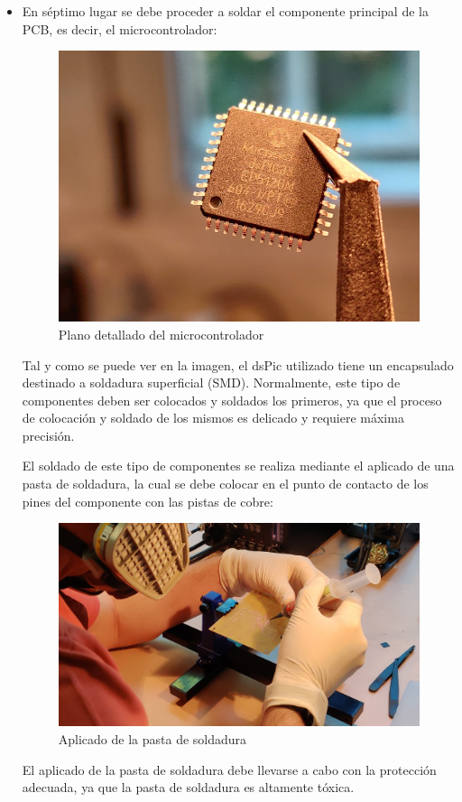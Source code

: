 \begin{itemize}
    \item En séptimo lugar se debe proceder a soldar el componente principal de la \ac{PCB}, es decir, el microcontrolador:
    
    \begin{figure}[H]
    \centering 
    \includegraphics[width=0.5\linewidth]{pictures/DSPIC.jpg}
    \caption{Plano detallado del microcontrolador}
    \label{fig:kdiagram}
    \end{figure}
    
    Tal y como se puede ver en la imagen, el dsPic utilizado tiene un encapsulado destinado a soldadura superficial (\ac{SMD}). Normalmente, este tipo de componentes deben ser colocados y soldados los primeros, ya que el proceso de colocación y soldado de los mismos es delicado y requiere máxima precisión.
    
    El soldado de este tipo de componentes se realiza mediante el aplicado de una pasta de soldadura, la cual se debe colocar en el punto de contacto de los pines del componente con las pistas de cobre:
    
    \begin{figure}[H]
    \centering 
    \includegraphics[width=0.65\linewidth]{pictures/SMD2.jpg}
    \caption{Aplicado de la pasta de soldadura}
    \label{fig:kdiagram}
    \end{figure}
    
    El aplicado de la pasta de soldadura debe llevarse a cabo con la protección adecuada, ya que la pasta de soldadura es altamente tóxica.
    

\end{itemize}
